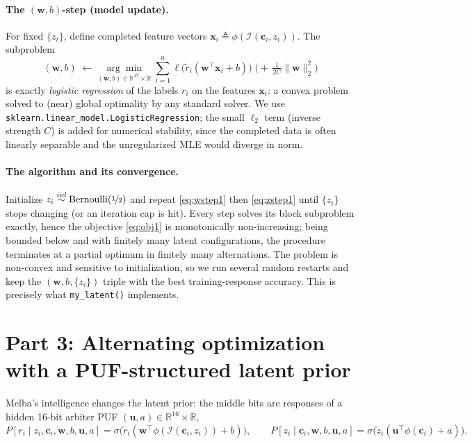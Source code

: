 \documentclass{article}
\newcommand{\vw}{\mathbf{w}}
\newcommand{\vu}{\mathbf{u}}
\newcommand{\vc}{\mathbf{c}}
\newcommand{\vx}{\mathbf{x}}
\newcommand{\R}{\mathbb{R}}
\newcommand{\ins}{\mathcal{I}}
\begin{document}
\paragraph{The $(\vw, b)$-step (model update).}
For fixed $\{z_i\}$, define completed feature vectors $\vx_i \triangleq \phi(\ins(\vc_i, z_i))$.
The subproblem
\begin{equation}
  \label{eq:wstep1}
  (\vw, b) \;\leftarrow\; \underset{(\vw, b) \in \R^{17}\times\R}{\arg\min}\;
  \sum_{i=1}^{n} \ell\!\big( \tilde r_i (\vw^\top \vx_i + b) \big)
  \;\Big(+\, \tfrac{1}{2C}\|\vw\|_2^2\Big)
\end{equation}
is exactly \emph{logistic regression} of the labels $r_i$ on the features $\vx_i$: a convex
problem solved to (near) global optimality by any standard solver. We use
\texttt{sklearn.linear\_model.LogisticRegression}; the small $\ell_2$ term (inverse strength
$C$) is added for numerical stability, since the completed data is often linearly separable
and the unregularized MLE would diverge in norm.

\paragraph{The algorithm and its convergence.}
Initialize $z_i \overset{iid}{\sim} \text{Bernoulli}(\nicefrac12)$ and repeat
\eqref{eq:wstep1} then \eqref{eq:zstep1} until $\{z_i\}$ stops changing (or an iteration cap
is hit). Every step solves its block subproblem exactly, hence the objective
\eqref{eq:obj1} is monotonically non-increasing; being bounded below and with finitely many
latent configurations, the procedure terminates at a partial optimum in finitely many
alternations. The problem is non-convex and sensitive to initialization, so we run several
random restarts and keep the $(\vw, b, \{z_i\})$ triple with the best training-response
accuracy. This is precisely what \texttt{my\_latent()} implements.

\section{Part 3: Alternating optimization with a PUF-structured latent prior}

Melba's intelligence changes the latent prior: the middle bits are responses of a hidden
16-bit arbiter PUF $(\vu, a) \in \R^{16}\times\R$,
\begin{equation*}
  P[r_i \mid z_i, \vc_i, \vw, b, \vu, a]
    = \sigma\!\big(\tilde r_i (\vw^\top \phi(\ins(\vc_i, z_i)) + b)\big),
  \qquad
  P[z_i \mid \vc_i, \vw, b, \vu, a]
    = \sigma\!\big(\tilde z_i (\vu^\top \phi(\vc_i) + a)\big).
\end{equation*}
\end{document}
